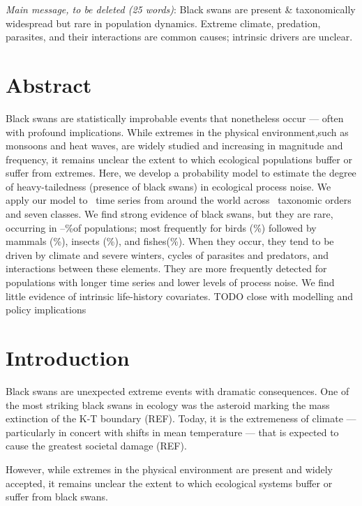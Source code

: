 
\noindent
\emph{Main message, to be deleted (25 words)}: Black swans are present \&
taxonomically widespread but rare in population dynamics. Extreme climate,
predation, parasites, and their interactions are common causes; intrinsic
drivers are unclear.

\section{Abstract}

Black swans are statistically improbable events that nonetheless occur ---
often with profound implications. While extremes in the physical
environment,such as monsoons and heat waves, are widely studied and increasing
in magnitude and frequency, it remains unclear the extent to which ecological
populations buffer or suffer from extremes. Here, we develop a probability
model to estimate the degree of heavy-tailedness (presence of black swans) in
ecological process noise. We apply our model to \NPops~time series from around
the world across \NOrders~taxonomic orders and seven classes. We find strong
evidence of black swans, but they are rare, occurring in
\overallMinPerc--\overallMaxPerc\%of populations; most frequently for birds
(\AvesRangePerc\%) followed by mammals (\MammaliaRangePerc\%), insects
(\InsectaRangePerc\%), and fishes(\OsteichthyesRangePerc\%). When they occur,
they tend to be driven by climate and severe winters, cycles of parasites and
predators, and interactions between these elements. They are more frequently
detected for populations with longer time series and lower levels of process
noise. We find little evidence of intrinsic life-history covariates. TODO close
with modelling and policy implications

\section{Introduction}

Black swans are unexpected extreme events with dramatic consequences. One of
the most striking black swans in ecology was the asteroid marking the mass
extinction of the K-T boundary (REF). Today, it is the extremeness of climate
--- particularly in concert with shifts in mean temperature --- that is
expected to cause the greatest societal damage (REF).

However, while extremes in the physical environment are present and widely
accepted, it remains unclear the extent to which ecological systems buffer or
suffer from black swans.

